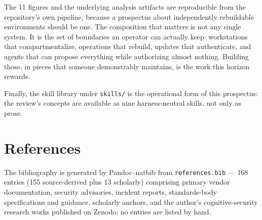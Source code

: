 \documentclass[
  english,
  9pt,
]{extarticle}
\begin{document}
The 11 figures and the underlying analysis artifacts are reproducible
from the repository's own pipeline, because a prospectus about
independently rebuildable environments should be one. The composition
that matters is not any single system. It is the set of boundaries an
operator can actually keep: workstations that compartmentalize,
operations that rebuild, updates that authenticate, and agents that can
propose everything while authorizing almost nothing. Building those, in
pieces that someone demonstrably maintains, is the work this horizon
rewards.

Finally, the skill library under \texttt{skills/} is the operational
form of this prospectus: the review's concepts are available as nine
harness-neutral skills, not only as prose.

\newpage

\section{References}\label{sec:references}

The bibliography is generated by Pandoc--natbib from
\texttt{references.bib} --- 168 entries (155 source-derived plus 13
scholarly) comprising primary vendor documentation, security advisories,
incident reports, standards-body specifications and guidance, scholarly
anchors, and the author's cognitive-security research works published on
Zenodo; no entries are listed by hand.



\providecommand{\bibsection}{}
\renewcommand{\bibsection}{}


\end{document}
